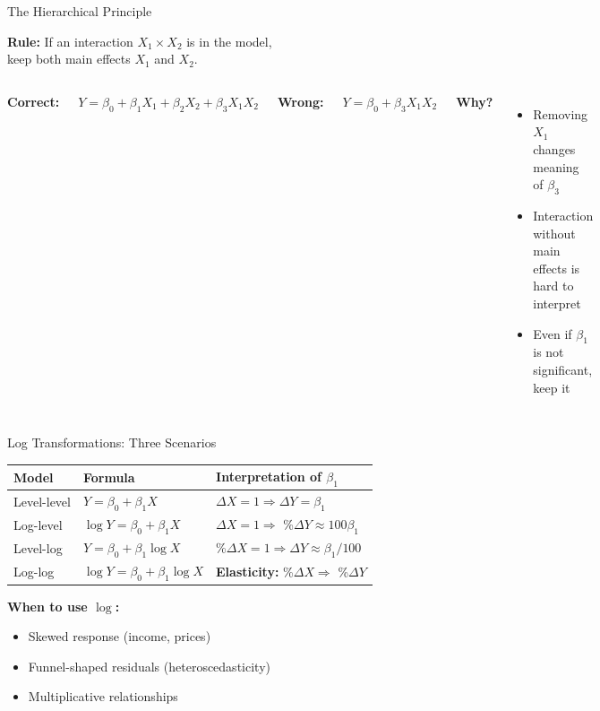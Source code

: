 \documentclass[aspectratio=169, 11pt]{beamer}
\begin{document}
\begin{frame}{The Hierarchical Principle}

\textbf{Rule:} If an interaction $X_1 \times X_2$ is in the model,\\
keep both main effects $X_1$ and $X_2$.

\vspace{0.5em}
\begin{columns}
\textcolor{softgreen}{\textbf{Correct:}}

$Y = \beta_0 + \beta_1 X_1 + \beta_2 X_2 + \beta_3 X_1 X_2$

\vspace{0.5em}
\textcolor{softred}{\textbf{Wrong:}}

$Y = \beta_0 + \beta_3 X_1 X_2$

\textbf{Why?}

\begin{itemize}
  \item Removing $X_1$ changes meaning of $\beta_3$
  \item Interaction without main effects is hard to interpret
  \item Even if $\beta_1$ is not significant, keep it
\end{itemize}
\end{columns}
\end{frame}


\begin{frame}{Log Transformations: Three Scenarios}

\begin{center}
\begin{tabular}{lll}
\toprule
Model & Formula & Interpretation of $\beta_1$ \\
\midrule
Level-level & $Y = \beta_0 + \beta_1 X$ & $\Delta X = 1 \Rightarrow \Delta Y = \beta_1$ \\
Log-level & $\log Y = \beta_0 + \beta_1 X$ & $\Delta X = 1 \Rightarrow$ \%$\Delta Y \approx 100\beta_1$ \\
Level-log & $Y = \beta_0 + \beta_1 \log X$ & \%$\Delta X = 1 \Rightarrow \Delta Y \approx \beta_1/100$ \\
Log-log & $\log Y = \beta_0 + \beta_1 \log X$ & \textbf{Elasticity:} \%$\Delta X \Rightarrow$ \%$\Delta Y$ \\
\bottomrule
\end{tabular}
\end{center}

\vspace{0.5em}
\textbf{When to use $\log$:}
\begin{itemize}
  \item Skewed response (income, prices)
  \item Funnel-shaped residuals (heteroscedasticity)
  \item Multiplicative relationships
\end{itemize}
\end{frame}
\end{document}
